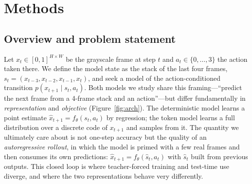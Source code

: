 \documentclass[10pt,twocolumn,letterpaper]{article}
\begin{document}
\section{Methods}

\subsection{Overview and problem statement}
Let $x_t\in[0,1]^{H\times W}$ be the grayscale frame at step $t$ and
$a_t\in\{0,\dots,3\}$ the action taken there. We define the model state as the
stack of the last four frames, $s_t=(x_{t-3},x_{t-2},x_{t-1},x_t)$, and seek a
model of the action-conditioned transition $p(x_{t+1}\mid s_t,a_t)$. Both models
we study share this framing---``predict the next frame from a 4-frame stack and
an action''---but differ fundamentally in \emph{representation} and
\emph{objective} (Figure~\ref{fig:arch}). The deterministic model learns a point
estimate $\hat{x}_{t+1}=f_\theta(s_t,a_t)$ by regression; the token model learns
a full distribution over a discrete code of $x_{t+1}$ and samples from it. The
quantity we ultimately care about is not one-step accuracy but the quality of an
\emph{autoregressive rollout}, in which the model is primed with a few real
frames and then consumes its own predictions:
$\hat{x}_{t+1}=f_\theta(\hat{s}_t,a_t)$ with $\hat{s}_t$ built from previous
outputs. This closed loop is where teacher-forced training and test-time use
diverge, and where the two representations behave very differently.
\end{document}
